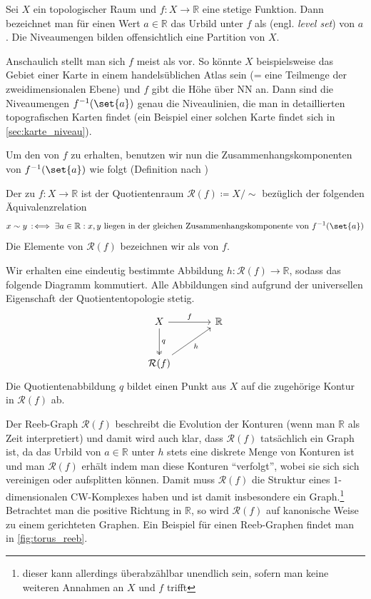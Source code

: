 Sei $X$ ein topologischer Raum und $f \colon X \to \mathbb{R}$ eine stetige Funktion.
Dann bezeichnet man für einen Wert $a \in \mathbb{R}$ das Urbild unter $f$ als  (engl. \emph{level set}) von $a$.
Die Niveaumengen bilden offensichtlich eine Partition von $X$.

Anschaulich stellt man sich $f$ meist als  vor.
So könnte $X$ beispielsweise das Gebiet einer Karte in einem handelsüblichen Atlas sein (= eine Teilmenge der zweidimensionalen Ebene) und $f$ gibt die Höhe über NN an.
Dann sind die Niveaumengen $f^{-1}(\set{a})$ genau die Niveaulinien, die man in detaillierten topografischen Karten findet (ein Beispiel einer solchen Karte findet sich in \cref{sec:karte_niveau}).

Um den  von $f$ zu erhalten, benutzen wir nun die Zusammenhangskomponenten von $f^{-1}(\set{a})$ wie folgt (Definition nach \textcite[.4]{compTopo})

\begin{definition}[{name=[Reeb-Graph]}]
	Der  zu $f \colon X \to \mathbb{R}$ ist der Quotientenraum $\mathcal{R}(f) \coloneqq X/{\sim}$ bezüglich der folgenden Äquivalenzrelation
	\[
		x \sim y \,:\mkern-3mu\iff \exists a \in \mathbb{R} : x,y \text{ liegen in der gleichen Zusammenhangskomponente von } f^{-1}(\set{a})
	\]
	Die Elemente von $\mathcal{R}(f)$ bezeichnen wir als  von $f$.
\end{definition}
Wir erhalten eine eindeutig bestimmte Abbildung $h \colon \mathcal{R}(f) \to \mathbb{R}$, sodass das folgende Diagramm kommutiert.
Alle Abbildungen sind aufgrund der universellen Eigenschaft der Quotiententopologie stetig.
\[
	\begin{tikzcd}[sep=large]
		X \rar["f"] \dar["q",two heads] & \mathbb{R} \\
		\mathcal{R}(f) \urar["h"']
	\end{tikzcd}
\]
Die Quotientenabbildung $q$ bildet einen Punkt aus $X$ auf die zugehörige Kontur in $\mathcal{R}(f)$ ab.

Der Reeb-Graph $\mathcal{R}(f)$ beschreibt die Evolution der Konturen (wenn man $\mathbb{R}$ als Zeit interpretiert) und damit wird auch klar, dass $\mathcal{R}(f)$ tatsächlich ein Graph ist, da das Urbild von $a \in \mathbb{R}$ unter $h$ stets eine diskrete Menge von Konturen ist und man $\mathcal{R}(f)$ erhält indem man diese Konturen \enquote{verfolgt}, wobei sie sich sich vereinigen oder aufsplitten können.
Damit muss $\mathcal{R}(f)$ die Struktur eines $1$-dimensionalen CW-Komplexes haben und ist damit insbesondere ein Graph.\footnote{dieser kann allerdings überabzählbar unendlich sein, sofern man keine weiteren Annahmen an $X$ und $f$ trifft}
Betrachtet man die positive Richtung in $\mathbb{R}$, so wird $\mathcal{R}(f)$ auf kanonische Weise zu einem gerichteten Graphen.
Ein Beispiel für einen Reeb-Graphen findet man in \cref{fig:torus_reeb}.

